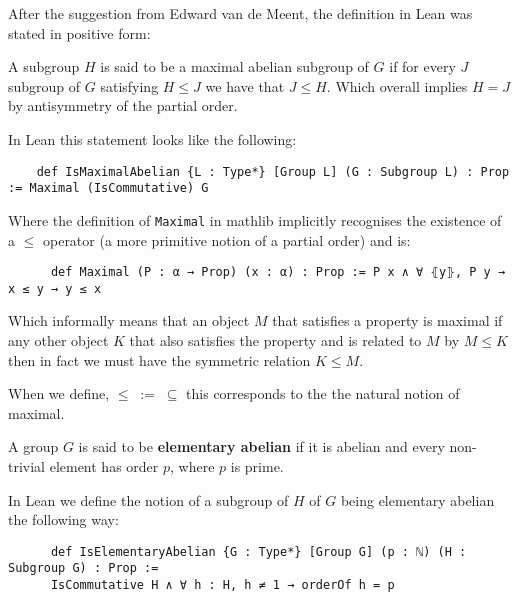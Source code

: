 \begin{remark}
After the suggestion from Edward van de Meent, the definition in Lean was stated in positive form:

A subgroup $H$ is said to be a maximal abelian subgroup of $G$ if for every $J$ subgroup of $G$ satisfying $H \le J$ we have that $J \le H$. Which overall implies $H = J$ by antisymmetry of the partial order.

In Lean this statement looks like the following:

\begin{footnotesize}
  \begin{verbatim}
    def IsMaximalAbelian {L : Type*} [Group L] (G : Subgroup L) : Prop := Maximal (IsCommutative) G
  \end{verbatim}
\end{footnotesize}


  Where the definition of \texttt{Maximal} in mathlib implicitly recognises the existence of a $\le$ operator (a more primitive notion of a partial order) and is:

  \begin{footnotesize}
    \begin{verbatim}
      def Maximal (P : α → Prop) (x : α) : Prop := P x ∧ ∀ ⦃y⦄, P y → x ≤ y → y ≤ x
    \end{verbatim}
  \end{footnotesize}
  

  Which informally means that an object $M$ that satisfies a property is maximal if any other object $K$ that also satisfies the property and is related to $M$ by $M \le K$ then in fact we must have the symmetric relation $K \le M$.

  When we define, $\le \; := \;  \subseteq$ this corresponds to the the natural notion of maximal.
\end{remark}


\begin{definition}
\label{IsElementaryAbelian}
\leanok
A group $G$ is said to be \textbf{elementary abelian} if it is abelian and every non-trivial element has order $p$, where $p$ is prime.
\end{definition}

\begin{remark}
  In Lean we define the notion of a subgroup of $H$ of $G$ being elementary abelian the following way:
  \begin{footnotesize}
  \begin{verbatim}
      def IsElementaryAbelian {G : Type*} [Group G] (p : ℕ) (H : Subgroup G) : Prop :=
      IsCommutative H ∧ ∀ h : H, h ≠ 1 → orderOf h = p
  \end{verbatim}
  \end{footnotesize}
 
\end{remark}

